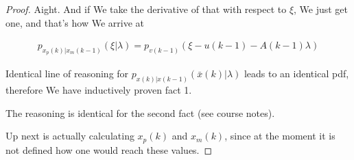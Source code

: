 \documentclass{article}
\begin{document}
\begin{proof}
			Aight. And if We take the derivative of that with respect to $\xi$, We just get one, and that's how We arrive at
			
			\begin{align}
				p_{x_p(k) | x_m(k-1)}(\xi|\lambda) = p_{v(k-1)} (\xi - u(k-1) - A(k-1)\lambda )
			\end{align}
			
			Identical line of reasoning for $p_{x(k)|x(k-1)}(\bar{x}(k)|\lambda)$ leads to an identical pdf, therefore We have inductively proven fact 1.
			
			The reasoning is identical for the second fact (see course notes).
			
			Up next is actually calculating $x_p(k)$ and $x_m(k)$, since at the moment it is not defined how one would reach these values.
			
			
			
			
			
			
			
			
		\end{proof}
	
	
	
	
	
	
	
	
	
	
	
\end{document}
